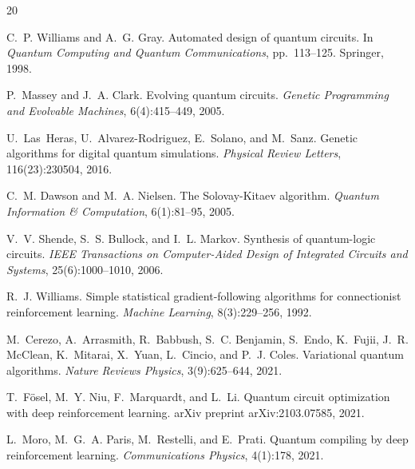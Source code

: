 \documentclass[twocolumn,11pt]{article}
\begin{document}
\begin{thebibliography}{20}

C.~P. Williams and A.~G. Gray.
\newblock Automated design of quantum circuits.
\newblock In \emph{Quantum Computing and Quantum Communications}, pp.~113--125.
  Springer, 1998.

P.~Massey and J.~A. Clark.
\newblock Evolving quantum circuits.
\newblock \emph{Genetic Programming and Evolvable Machines}, 6(4):415--449, 2005.

U.~Las~Heras, U.~Alvarez-Rodriguez, E.~Solano, and M.~Sanz.
\newblock Genetic algorithms for digital quantum simulations.
\newblock \emph{Physical Review Letters}, 116(23):230504, 2016.

C.~M. Dawson and M.~A. Nielsen.
\newblock The {S}olovay-{K}itaev algorithm.
\newblock \emph{Quantum Information \& Computation}, 6(1):81--95, 2005.

V.~V. Shende, S.~S. Bullock, and I.~L. Markov.
\newblock Synthesis of quantum-logic circuits.
\newblock \emph{IEEE Transactions on Computer-Aided Design of Integrated
  Circuits and Systems}, 25(6):1000--1010, 2006.

R.~J. Williams.
\newblock Simple statistical gradient-following algorithms for connectionist
  reinforcement learning.
\newblock \emph{Machine Learning}, 8(3):229--256, 1992.

M.~Cerezo, A.~Arrasmith, R.~Babbush, S.~C. Benjamin, S.~Endo, K.~Fujii,
  J.~R. McClean, K.~Mitarai, X.~Yuan, L.~Cincio, and P.~J. Coles.
\newblock Variational quantum algorithms.
\newblock \emph{Nature Reviews Physics}, 3(9):625--644, 2021.

T.~F\"osel, M.~Y. Niu, F.~Marquardt, and L.~Li.
\newblock Quantum circuit optimization with deep reinforcement learning.
\newblock arXiv preprint arXiv:2103.07585, 2021.

L.~Moro, M.~G.~A. Paris, M.~Restelli, and E.~Prati.
\newblock Quantum compiling by deep reinforcement learning.
\newblock \emph{Communications Physics}, 4(1):178, 2021.


\end{thebibliography}
\end{document}
